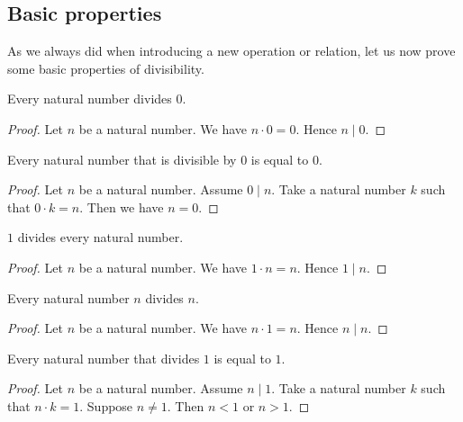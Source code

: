 \documentclass[../../arithmetic.ftl.tex]{subfiles}
\begin{document}
  \subsection{Basic properties}

  As we always did when introducing a new operation or relation, let us now
  prove some basic properties of divisibility.

  \begin{forthel}
    \begin{proposition}\label{Arithmetic_03_01_148842}
      Every natural number divides $0$.
    \end{proposition}
    \begin{proof}
      Let $n$ be a natural number.
      We have $n \cdot 0 = 0$.
      Hence $n \mid 0$.
    \end{proof}

    \begin{proposition}\label{Arithmetic_03_01_295259}
      Every natural number that is divisible by $0$ is equal to $0$.
    \end{proposition}
    \begin{proof}
      Let $n$ be a natural number.
      Assume $0 \mid n$.
      Take a natural number $k$ such that $0 \cdot k = n$.
      Then we have $n = 0$.
    \end{proof}

    \begin{proposition}\label{Arithmetic_03_01_856465}
      $1$ divides every natural number.
    \end{proposition}
    \begin{proof}
      Let $n$ be a natural number.
      We have $1 \cdot n = n$.
      Hence $1 \mid n$.
    \end{proof}

    \begin{proposition}\label{Arithmetic_03_01_258975}
      Every natural number $n$ divides $n$.
    \end{proposition}
    \begin{proof}
      Let $n$ be a natural number.
      We have $n \cdot 1 = n$.
      Hence $n \mid n$.
    \end{proof}

    \begin{proposition}\label{Arithmetic_03_01_211137}
      Every natural number that divides $1$ is equal to $1$.
    \end{proposition}
    \begin{proof}
      Let $n$ be a natural number.
      Assume $n \mid 1$.
      Take a natural number $k$ such that $n \cdot k = 1$.
      Suppose $n \neq 1$.
      Then $n < 1$ or $n > 1$.


\end{proof}
\end{forthel}
\end{document}
